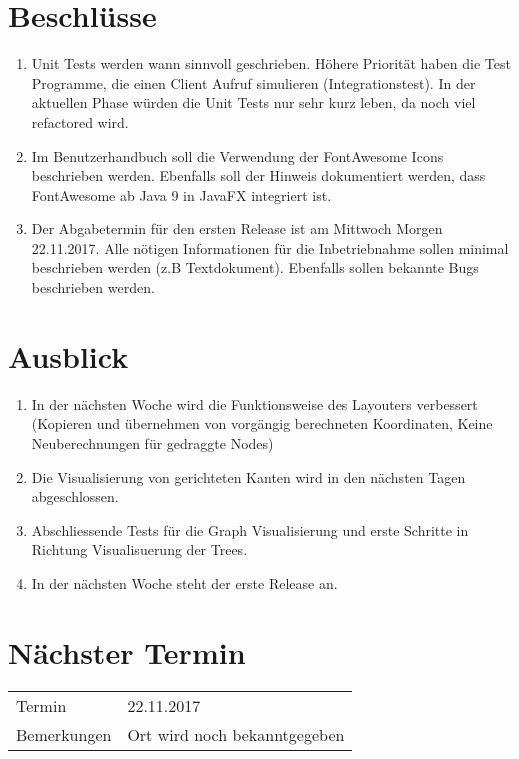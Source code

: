 \documentclass[11pt, a4paper,oneside]{scrartcl}
\begin{document}
\section{Beschlüsse}
\begin{enumerate}
	\item Unit Tests werden wann sinnvoll geschrieben. Höhere Priorität haben die Test Programme, die einen Client Aufruf simulieren (Integrationstest). In der aktuellen Phase würden die Unit Tests nur sehr kurz leben, da noch viel refactored wird.
	\item Im Benutzerhandbuch soll die Verwendung der FontAwesome Icons beschrieben werden. Ebenfalls soll der Hinweis dokumentiert werden, dass FontAwesome ab Java 9 in JavaFX integriert ist.
	\item Der Abgabetermin für den ersten Release ist am Mittwoch Morgen 22.11.2017. Alle nötigen Informationen für die Inbetriebnahme sollen minimal beschrieben werden (z.B Textdokument). Ebenfalls sollen bekannte Bugs beschrieben werden.
\end{enumerate} 

\section{Ausblick}
\begin{enumerate}
	\item In der nächsten Woche wird die Funktionsweise des Layouters verbessert (Kopieren und übernehmen von vorgängig berechneten Koordinaten, Keine Neuberechnungen für gedraggte Nodes)
 	\item Die Visualisierung von gerichteten Kanten wird in den nächsten Tagen abgeschlossen.
 	\item Abschliessende Tests für die Graph Visualisierung und erste Schritte in Richtung Visualisuerung der Trees.
 	\item In der nächsten Woche steht der erste Release an.
\end{enumerate}

\section{Nächster Termin}
\begin{tabu} to \linewidth {l X }
	\toprule
	Termin & 22.11.2017  \\
	Bemerkungen & Ort wird noch bekanntgegeben   \\
	\bottomrule
\end{tabu}
\end{document}
